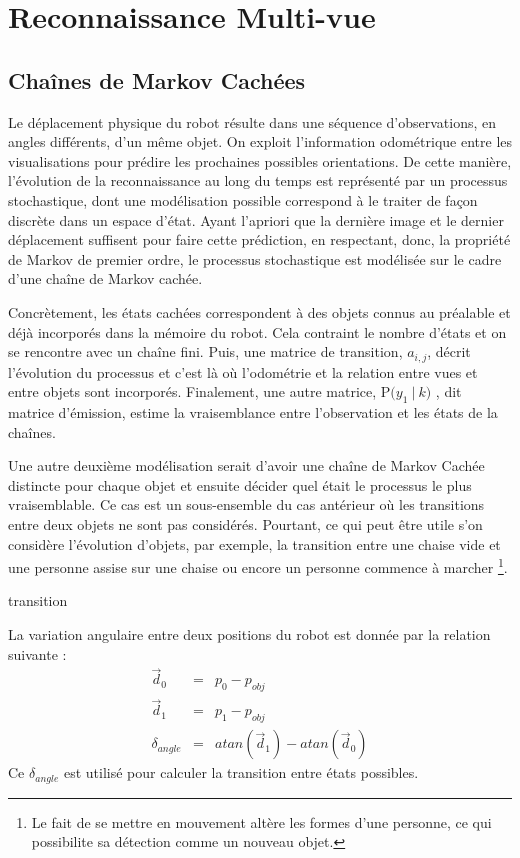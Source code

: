 \section {Reconnaissance Multi-vue}

\subsection {Chaînes de Markov Cachées}

Le déplacement physique du robot résulte dans une séquence
d'observations, en angles différents, d'un même objet. On exploit
l'information odométrique entre les visualisations pour prédire les
prochaines possibles orientations. De cette manière, l'évolution de la
reconnaissance au long du temps est représenté par un processus
stochastique, dont une modélisation possible correspond à le traiter
de façon discrète dans un espace d'état. Ayant l'apriori que la
dernière image et le dernier déplacement suffisent pour faire cette
prédiction, en respectant, donc, la propriété de Markov de premier
ordre, le processus stochastique est modélisée sur le cadre d'une
chaîne de Markov cachée.

Concrètement, les états cachées correspondent à des objets connus au
préalable et déjà incorporés dans la mémoire du robot. Cela contraint le
nombre d'états et on se rencontre avec un chaîne fini. Puis, une
matrice de transition, $a_{i,j}$, décrit l'évolution du processus et c'est là où
l'odométrie et la relation entre vues et entre objets sont
incorporés. Finalement, une autre matrice, $\mathrm{P}\big( y_1 \ | \ k \big)$
, dit matrice d'émission, estime la vraisemblance entre l'observation
et les états de la chaînes.

Une autre deuxième modélisation serait d'avoir une chaîne de Markov
Cachée distincte pour chaque objet et ensuite décider quel était le
processus le plus vraisemblable. Ce cas est un sous-ensemble du cas
antérieur où les transitions entre deux objets ne sont pas
considérés. Pourtant, ce qui peut être utile s'on considère
l'évolution d'objets, par exemple, la transition entre une chaise vide
et une personne assise sur une chaise ou encore un personne
commence à marcher \footnote{Le fait de se mettre en mouvement
  altère les formes d'une personne, ce qui possibilite sa détection
  comme un nouveau objet.}.
  
transition

La variation angulaire entre deux positions du robot est donnée par la relation suivante :
\begin{equation*}
\begin{array}{rcl}
  \vec{d}_0 &=& p_0 - p_{obj}\\
  \vec{d}_1 &=& p_1 - p_{obj} \\
   \delta_{angle} &=& atan(\vec{d}_1) - atan(\vec{d}_0)
\end{array}
\end{equation*}
Ce $\delta_{angle}$ est utilisé pour calculer la transition entre états possibles.

